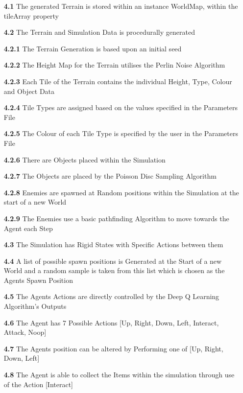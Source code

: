 \begin{flushleft}
\begin{itemize}
            \item[\textbf{4.1}] The generated Terrain is stored within an instance WorldMap, within the \textsf{tileArray} property
            \item[\textbf{4.2}] The Terrain and Simulation Data is procedurally generated
            \item[\textbf{4.2.1}] The Terrain Generation is based upon an initial seed
            \item[\textbf{4.2.2}] The Height Map for the Terrain utilises the Perlin Noise Algorithm
            \item[\textbf{4.2.3}] Each Tile of the Terrain contains the individual Height, Type, Colour and Object Data
            \item[\textbf{4.2.4}] Tile Types are assigned based on the values specified in the Parameters File
            \item[\textbf{4.2.5}] The Colour of each Tile Type is specified by the user in the Parameters File
            \item[\textbf{4.2.6}] There are Objects placed within the Simulation
            \item[\textbf{4.2.7}] The Objects are placed by the Poisson Disc Sampling Algorithm
            \item[\textbf{4.2.8}] Enemies are spawned at Random positions within the Simulation at the start of a new World
            \item[\textbf{4.2.9}] The Enemies use a basic pathfinding Algorithm to move towards the Agent each Step
            \item[\textbf{4.3}] The Simulation has Rigid States with Specific Actions between them
            \item[\textbf{4.4}] A list of possible spawn positions is Generated at the Start of a new World and a random sample is taken from this list which is chosen as the Agents Spawn Position 
            \item[\textbf{4.5}] The Agents Actions are directly controlled by the Deep Q Learning Algorithm's Outputs
            \item[\textbf{4.6}] The Agent has 7 Possible Actions [Up, Right, Down, Left, Interact, Attack, Noop]
            \item[\textbf{4.7}] The Agents position can be altered by Performing one of [Up, Right, Down, Left] 
            \item[\textbf{4.8}] The Agent is able to collect the Items within the simulation through use of the Action [Interact]

\end{itemize}
\end{flushleft}
